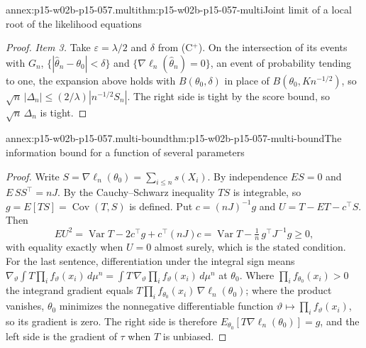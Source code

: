 \begin{annexitem}{annex:p15-w02b-p15-057.multi}{thm:p15-w02b-p15-057-multi}{Joint limit of a local root of the likelihood equations}
\begin{proof}
\emph{Item 3.} Take \(\varepsilon=\lambda/2\) and \(\delta\) from
(C\(^{+}\)). On the intersection of its events with \(G_n\),
\(\{|\widehat\theta_n-\theta_0|<\delta\}\) and
\(\{\nabla\ell_n(\widehat\theta_n)=0\}\), an event of probability tending
to one, the expansion above holds with \(B(\theta_0,\delta)\) in place of
\(B(\theta_0,Kn^{-1/2})\), so
\(\sqrt n\,|\Delta_n|\leq(2/\lambda)|n^{-1/2}S_n|\). The right side is
tight by the score bound, so \(\sqrt n\,\Delta_n\) is tight.
\end{proof}
\end{annexitem}

\begin{annexitem}{annex:p15-w02b-p15-057.multi-bound}{thm:p15-w02b-p15-057-multi-bound}{The information bound for a function of several parameters}
\begin{proof}
Write \(S=\nabla\ell_n(\theta_0)=\sum_{i\leq n}s(X_i)\). By independence
\(ES=0\) and \(E\,SS^{\top}=nJ\). By the Cauchy--Schwarz inequality
\(TS\) is integrable, so \(g=E[TS]=\operatorname{Cov}(T,S)\) is defined.
Put \(c=(nJ)^{-1}g\) and \(U=T-ET-c^{\top}S\). Then
\[
 EU^2=\operatorname{Var}T-2c^{\top}g+c^{\top}(nJ)c
 =\operatorname{Var}T-\tfrac1n\,g^{\top}J^{-1}g\geq0,
\]
with equality exactly when \(U=0\) almost surely, which is the stated
condition. For the last sentence, differentiation under the integral sign
means
\(\nabla_\vartheta\int T\prod_if_\vartheta(x_i)\,d\mu^n=\int
T\,\nabla_\vartheta\prod_if_\vartheta(x_i)\,d\mu^n\) at \(\theta_0\). Where
\(\prod_if_{\theta_0}(x_i)>0\) the integrand gradient equals
\(T\prod_if_{\theta_0}(x_i)\,\nabla\ell_n(\theta_0)\); where the product
vanishes, \(\theta_0\) minimizes the nonnegative differentiable function
\(\vartheta\mapsto\prod_if_\vartheta(x_i)\), so its gradient is zero.
The right side is therefore \(E_{\theta_0}[T\nabla\ell_n(\theta_0)]=g\),
and the left side is the gradient of \(\tau\) when \(T\) is unbiased.
\end{proof}
\end{annexitem}

